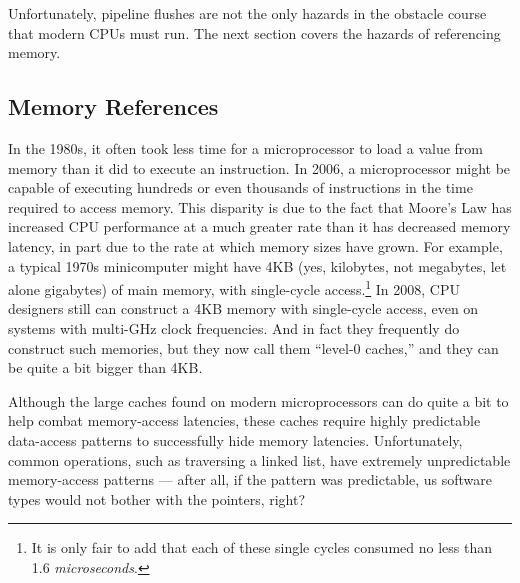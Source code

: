 Unfortunately, pipeline flushes are not the only hazards in the obstacle
course that modern CPUs must run.
The next section covers the hazards of referencing memory.

\subsection{Memory References}
\label{sec:cpu:Memory References}

In the 1980s, it often took less time for a microprocessor to load a value
from memory than it did to execute an instruction.
In 2006, a microprocessor might be capable of executing hundreds or even
thousands of instructions in the time required to access memory.
This disparity is due to the fact that Moore's Law has increased CPU
performance at a much greater rate than it has decreased memory latency,
in part due to the rate at which memory sizes have grown.
For example, a typical 1970s minicomputer might have 4KB (yes, kilobytes,
not megabytes, let alone gigabytes) of main memory, with
single-cycle access.\footnote{
	It is only fair to add that each of these single cycles
	consumed no less than 1.6 \emph{microseconds}.}
In 2008, CPU designers still can construct a 4KB memory with single-cycle
access, even on systems with multi-GHz clock frequencies.
And in fact they frequently do construct such memories, but they now
call them ``level-0 caches,'' and they can be quite a bit bigger than 4KB.

Although the large caches found on modern microprocessors can do quite
a bit to help combat memory-access latencies,
these caches require highly predictable data-access patterns to
successfully hide memory latencies.
Unfortunately, common operations, such as traversing a linked list,
have extremely unpredictable memory-access patterns --- after all,
if the pattern was predictable, us software types would not bother
with the pointers, right?

